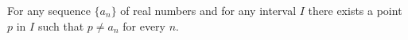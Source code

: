 For any sequence $\{a_n\}$ of real numbers and for any interval $I$ there exists a point $p$ in $I$ such that $p \neq a_n$ for every $n$.
